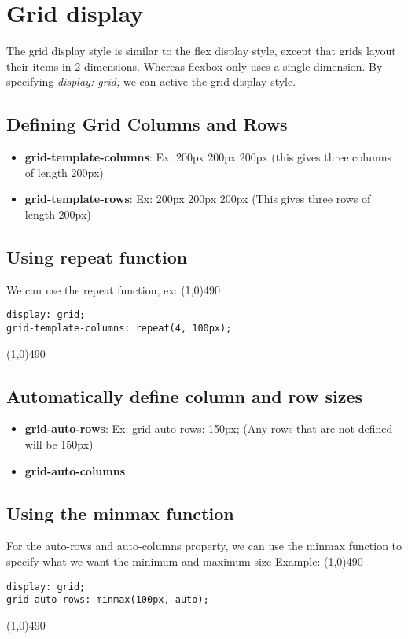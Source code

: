 \documentclass{report}
\begin{document}
    \pagebreak \bigbreak \noindent 
    \section{\LARGE Grid display}
    \bigbreak \noindent 
    The grid display style is similar to the flex display style, except that grids layout their items in 2 dimensions. Whereas flexbox only uses a single dimension. By specifying \textit{display: grid;} we can active the grid display style.
    \bigbreak \noindent 
    \subsection{Defining Grid Columns and Rows}
    \begin{itemize}
        \item \textbf{grid-template-columns}: Ex: 200px 200px 200px (this gives three columns of length 200px)
        \item \textbf{grid-template-rows}: Ex: 200px 200px 200px (This gives three rows of length 200px)
    \end{itemize}

    \bigbreak \noindent 
    \subsection{Using repeat function}
    \bigbreak \noindent 
    We can use the repeat function, ex:
    \bigbreak \noindent 
    \line(1,0){490}
    \begin{verbatim}
display: grid;
grid-template-columns: repeat(4, 100px);
    \end{verbatim}
    \line(1,0){490}

    \bigbreak \noindent 
    \subsection{Automatically define column and row sizes}
    \begin{itemize}
        \item \textbf{grid-auto-rows}: Ex: grid-auto-rows: 150px; (Any rows that are not defined will be 150px)
        \item \textbf{grid-auto-columns}
    \end{itemize}

    \bigbreak \noindent 
    \subsection{Using the minmax function}
    \bigbreak \noindent 
    For the auto-rows  and auto-columns property, we can use the minmax function to specify what we want the minimum and maximum size
    \bigbreak \noindent 
    Example:
    \bigbreak \noindent 
    \line(1,0){490}
    \begin{verbatim}
display: grid;
grid-auto-rows: minmax(100px, auto);
    \end{verbatim}
    \line(1,0){490}
\end{document}
